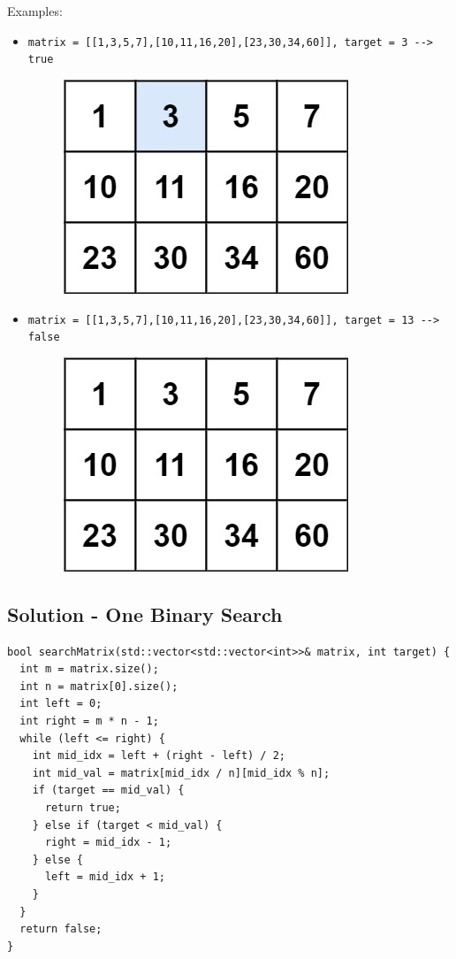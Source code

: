 Examples:
\begin{itemize}
	\item {\colorbox{CodeBackground}{\lstinline|matrix = [[1,3,5,7],[10,11,16,20],[23,30,34,60]], target = 3 --> true|}}
	\begin{figure}[H]
		\centering
		\includegraphics[width=0.2\linewidth]{images/lc0074_example1}
		\label{fig:lc0074example1}
	\end{figure}
	\item {\colorbox{CodeBackground}{\lstinline|matrix = [[1,3,5,7],[10,11,16,20],[23,30,34,60]], target = 13 --> false|}}
	\begin{figure}[H]
		\centering
		\includegraphics[width=0.2\linewidth]{images/lc0074_example2}
		\label{fig:lc0074example2}
	\end{figure}
\end{itemize}

\subsection*{Solution - One Binary Search}
\begin{lstlisting}
bool searchMatrix(std::vector<std::vector<int>>& matrix, int target) {
  int m = matrix.size();
  int n = matrix[0].size();
  int left = 0;
  int right = m * n - 1;
  while (left <= right) {
    int mid_idx = left + (right - left) / 2;
    int mid_val = matrix[mid_idx / n][mid_idx % n];
    if (target == mid_val) {
      return true;
    } else if (target < mid_val) {
      right = mid_idx - 1;
    } else {
      left = mid_idx + 1;
    }
  }
  return false;
}
\end{lstlisting}

